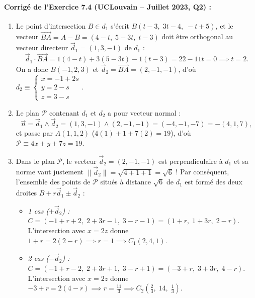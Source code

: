 \paragraph{Corrigé de l'Exercice 7.4 (UCLouvain -- Juillet 2023, Q2) :}
\begin{enumerate}[label=(\alph*)]
    \item Le point d'intersection $B \in d_1$ s'écrit $B(t-3,\; 3t-4,\; -t+5)$, et le vecteur $\overrightarrow{BA} = A - B = (4-t,\; 5-3t,\; t-3)$ doit être orthogonal au vecteur directeur $\vec{d}_1 = (1, 3, -1)$ de $d_1$ :
    \[
        \vec{d}_1 \cdot \overrightarrow{BA} = 1(4-t) + 3(5-3t) - 1(t-3) = 22 - 11t = 0 \implies t = 2.
    \]
    On a donc $B(-1, 2, 3)$ et $\vec{d}_2 = \overrightarrow{BA} = (2, -1, -1)$, d'où $\boxed{d_2 \equiv \begin{cases} x = -1 + 2s \\ y = 2 - s \\ z = 3 - s \end{cases}}$.
    \item Le plan $\mathcal{P}$ contenant $d_1$ et $d_2$ a pour vecteur normal :
    \[
        \vec{n} = \vec{d}_1 \wedge \vec{d}_2 = (1, 3, -1) \wedge (2, -1, -1) = (-4, -1, -7) = -(4, 1, 7),
    \]
    et passe par $A(1, 1, 2)$ ($4(1)+1+7(2)=19$), d'où $\boxed{\mathcal{P} \equiv 4x + y + 7z = 19}$.
    \item Dans le plan $\mathcal{P}$, le vecteur $\vec{d}_2 = (2, -1, -1)$ est perpendiculaire à $d_1$ et sa norme vaut justement $\|\vec{d}_2\| = \sqrt{4+1+1} = \sqrt{6}$ ! Par conséquent, l'ensemble des points de $\mathcal{P}$ situés à distance $\sqrt{6}$ de $d_1$ est formé des deux droites $B + r\vec{d}_1 \pm \vec{d}_2$ :
    \begin{itemize}
        \item \emph{1\ier{} cas ($+\vec{d}_2$) :} $C = (-1+r+2,\; 2+3r-1,\; 3-r-1) = (1+r,\; 1+3r,\; 2-r)$. L'intersection avec $x = 2z$ donne $1+r = 2(2-r) \implies r = 1 \implies \boxed{C_1(2, 4, 1)}$.
        \item \emph{2\ieme{} cas ($-\vec{d}_2$) :} $C = (-1+r-2,\; 2+3r+1,\; 3-r+1) = (-3+r,\; 3+3r,\; 4-r)$. L'intersection avec $x = 2z$ donne $-3+r = 2(4-r) \implies r = \frac{11}{3} \implies \boxed{C_2\left(\frac{2}{3},\; 14,\; \frac{1}{3}\right)}$.
    \end{itemize}
\end{enumerate}

